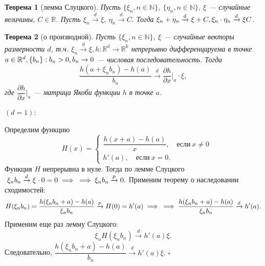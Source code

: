 \documentclass[12pt]{report}
\renewenvironment{proof}{{\bfseries Доказательство:}}{$\square$\\\\}
\newtheorem{theorem}{Теорема}
\theoremstyle{definition}
\begin{document}
\begin{theorem}[лемма Слуцкого]
	Пусть $\{\xi_n, n \in \mathbb{N}\},\ \{\eta_n, n \in \mathbb{N}\},\ \xi$ — случайные величины, $C \in \mathbb{R}$. Пусть $\xi_n \xrightarrow{d} \xi, \ \eta_n \xrightarrow{d} C.$ Тогда $\xi_n + \eta_n  \xrightarrow{d} \xi + C,\\ \xi_n \cdot \eta_n  \xrightarrow{d} \xi C$. 
\end{theorem}

\begin{theorem}[о производной]
	Пусть $\{\xi_n, n \in \mathbb{N}\},\ \xi$ — случайные векторы размерности $d$, т.ч. $\xi_n \xrightarrow{d} \xi, h: \mathbb{R}^d \rightarrow \mathbb{R}^k$ 
непрерывно дифференцируема в точке $a \in \mathbb{R}^d,\\ \{b_n \}: b_n > 0, b_n \rightarrow 0$ — числовая последовательность. Тогда  
$$\dfrac{h(a + \xi_n b_n) - h(a)}{b_n} \xrightarrow{d} \dfrac{\partial h}{\partial x}\Bigr\rvert_a \cdot \xi, $$  
где $\dfrac{\partial h}{\partial x}\Bigr\rvert_a$ — матрица Якоби функции $h$ в точке $a$.
\end{theorem}
\begin{proof}
	$(d = 1)$:

	Определим функцию 
	$$\quad H(x) = \begin{cases}
	\dfrac{h(x+a) - h(a)}{x},\quad если\ x \neq 0 \\
	h'(a), \quad если \ x = 0.
	\end{cases} $$  
	Функция $H$ непрерывна в нуле. Тогда по лемме Слуцкого $\ \xi_n b_n \xrightarrow{d} \xi \cdot 0 = 0 \implies \\ \implies \xi_n b_n \xrightarrow{p} 0.$ Применим теорему о наследовании сходимостей:
	$$ H(\xi_n b_n) = \dfrac{h(\xi_n b_n+a) - h(a)}{\xi_n b_n} \xrightarrow{p} H(0) = h'(a) \implies \\ \implies  \dfrac{h(\xi_n b_n+a) - h(a)}{\xi_n b_n} \xrightarrow{d} h'(a). $$
	Применим еще раз лемму Слуцкого:
	$$ \xi_n H(\xi_n b_n) \xrightarrow{d} h'(a)\xi. $$
	Следовательно, $\dfrac{h(\xi_n b_n+a) - h(a)}{b_n} \xrightarrow{d} h'(a) \xi.$
\end{proof}
\end{document}
